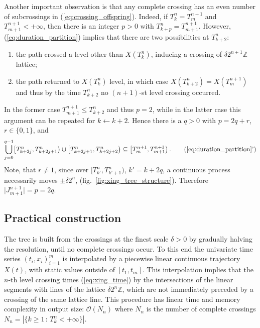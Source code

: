 \documentclass[a4paper]{article}
\begin{document}
Another important observation is that any complete crossing has an even number of
subcrossings in (\ref{eq:crossing_offspring}). Indeed, if $T_k^n = T_m^{n+1}$ and
$T_{m+1}^{n+1} < +\infty$, then there is an integer $p > 0$ with $T_{k+p}^n = T_{m+1}^{n+1}$.
However, (\ref{eq:duration_partition}) implies that there are two possibilities at
$T_{k+2}^n$:
\begin{enumerate}
    \item the path crossed a level other than $X(T_k^n)$, inducing a crossing of
    $\delta 2^{n+1}\mathbb{Z}$ lattice;
    \item the path returned to $X(T_k^n)$ level, in which case $X(T_{k+2}^n) = X(T_m^{n+1})$
    and thus by the time $T_{k+2}^n$ no $(n+1)$-st level crossing occurred.
\end{enumerate}
In the former case $T_{m+1}^{n+1} \leq T_{k+2}^n$ and thus $p=2$, while in the latter
case this argument can be repeated for $k \leftarrow k+2$. Hence there is a $q > 0$
with $p = 2q + r$, $r \in \{0, 1\}$, and
\begin{equation*} \label{eq:subcrossing_partition}
    \bigcup_{j=0}^{q-1} \bigl[T_{k+2j}^n, T_{k+2j+1}^n\bigr)
                   \cup \bigl[T_{k+2j+1}^n, T_{k+2j+2}^n\bigr)
        \subseteq \bigl[T_m^{n+1}, T_{m+1}^{n+1}\bigr) \,.
        \tag{\ref{eq:duration_partition}'}
\end{equation*}
Note, that $r\neq 1$, since over $\bigl[T_{k'}^n, T_{k'+1}^n\bigr)$, $k' = k + 2q$,
a continuous process necessarily moves $\pm \delta 2^n$, (fig.~\ref{fig:xing_tree_structure}).
Therefore $\bigl| J_{m+1}^{n+1} \bigr| = p = 2q$.


\subsection{Practical construction} %
\label{sub:practical_construction}

The tree is built from the crossings at the finest scale $\delta > 0$ by gradually
halving the resolution, until no complete crossings occur. To this end the univariate
time series $(t_i, x_i)_{i=1}^m$ is interpolated by a piecewise linear continuous
trajectory $X(t)$, with static values outside of $[t_1, t_m]$. This interpolation
implies that the $n$-th level crossing times (\ref{eq:xing_time}) by the intersections
of the linear segments with lines of the lattice $\delta 2^n \mathbb{Z}$, which
are not immediately preceded by a crossing of the same lattice line. This procedure
has linear time and memory complexity in output size: $\mathcal{O}(N_n)$ where $N_n$
is the number of complete crossings $N_n = |\{k\geq 1\,:\, T_k^n < +\infty\}|$.
\end{document}
